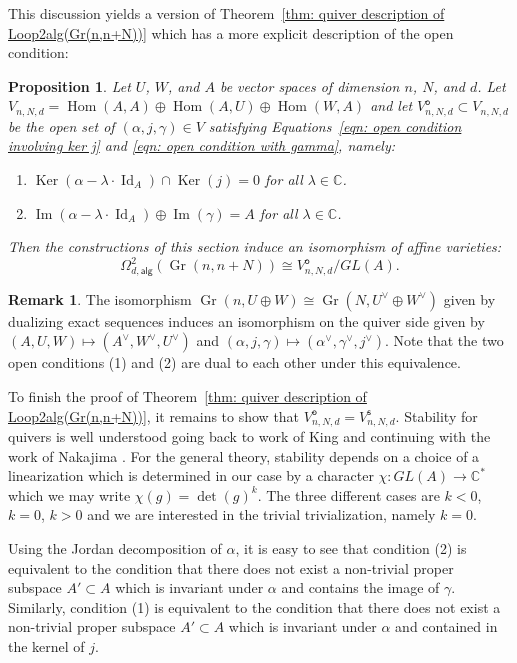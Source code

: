 \documentclass{amsart}
\newtheorem{proposition}[theorem]{Proposition}
\theoremstyle{definition}
\newtheorem{remark}[theorem]{Remark}
\newcommand{\CC} {{\mathbb C}}          %
\newcommand{\Hom}{\operatorname{Hom}}
\newcommand{\Ker}{\operatorname{Ker}}
\newcommand{\im}{\operatorname{Im}}
\newcommand{\alg}{\mathsf{alg}}
\newcommand{\open}{\mathsf{o}}
\newcommand{\stable}{\mathsf{s}}
\newcommand{\Gr}{\operatorname{Gr}}
\newcommand{\LoopTwo}{\Omega^{2}_{d,\alg}}
\newcommand{\Id}{\operatorname{Id}}
\begin{document}
This discussion yields a version of Theorem~\ref{thm: quiver description
of Loop2alg(Gr(n,n+N))} which has a more explicit description of the open
condition:

\begin{proposition}\label{prop: quiver description of Loop2(Gr(n,n+N))
with explicit stability condition}
Let $U$, $W$, and $A$ be vector spaces of dimension $n$, $N$, and
$d$. Let $V_{n,N,d} = \Hom (A,A)\oplus \Hom (A,U)\oplus \Hom (W,A)$ and let
$V^{\open}_{n,N,d}\subset V_{n,N,d}$ be the open set of $(\alpha ,j,\gamma )\in V$
satisfying Equations~\eqref{eqn: open condition involving ker j} and
\eqref{eqn: open condition with gamma}, namely:
\begin{enumerate}
\item $\Ker (\alpha -\lambda \cdot \Id_{A})\cap \Ker (j) = 0$ for all
$\lambda\in \CC $.
\item  $\im (\alpha -\lambda \cdot \Id_{A})\oplus  \im (\gamma )=A$ for
all $\lambda\in \CC $.
\end{enumerate}
Then the constructions of this section induce an isomorphism of affine
varieties:
\[
\LoopTwo (\Gr (n,n+N))\cong V^{\open}_{n,N,d}/GL(A) .
\]
\end{proposition}


\begin{remark}\label{rem: duality induced by Gr(n,n+N)=Gr(N,n+N)}
The isomorphism $\Gr (n,U\oplus W)\cong \Gr (N,U^{\vee}\oplus
W^{\vee})$ given by dualizing exact sequences induces an isomorphism
on the quiver side given by $(A,U,W)\mapsto
(A^{\vee},W^{\vee},U^{\vee})$ and $(\alpha ,j,\gamma )\mapsto
(\alpha^{\vee},\gamma^{\vee},j^{\vee})$. Note that the two open
conditions (1) and (2) are dual to each other under this equivalence. 
\end{remark}


To finish the proof of Theorem~\ref{thm: quiver description of
Loop2alg(Gr(n,n+N))}, it remains to show that $V^{\open}_{n,N,d} =
V^{\stable}_{n,N,d}$. Stability for quivers is well understood going
back to work of King \cite{King-quivers} and continuing with the work
of Nakajima \cite{Nakajima-Duke88,Nakajima-Handsaw}. For the general
theory, stability depends on a choice of a linearization which is
determined in our case by a character $\chi : GL(A)\to \CC^{*}$ which
we may write $\chi (g) = \operatorname{det}(g)^{k}$. The three
different cases are $k<0$, $k=0$, $k>0$ and we are interested in the
trivial trivialization, namely $k=0$.

Using the Jordan decomposition of $\alpha$, it is easy to see that
condition (2) is equivalent to the condition that there does not exist
a non-trivial proper subspace $A'\subset A$ which is invariant under
$\alpha$ and contains the image of $\gamma$. Similarly, condition (1)
is equivalent to the condition that there does not exist a non-trivial
proper subspace $A'\subset A$ which is invariant under $\alpha$ and
contained in the kernel of $j$.
\end{document}
